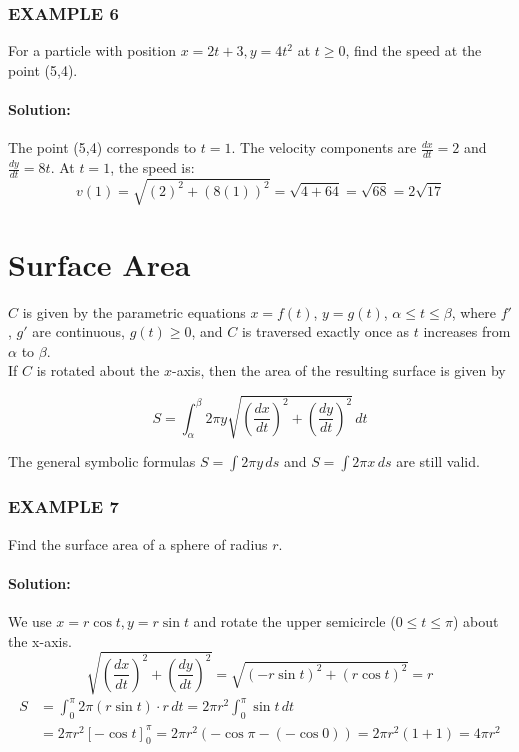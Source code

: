 \documentclass{article}
\begin{document}
\subsubsection*{EXAMPLE 6}
For a particle with position $x=2t+3, y=4t^2$ at $t \ge 0$, find the speed at the point (5,4).

\paragraph{Solution:}
The point (5,4) corresponds to $t=1$. The velocity components are $\frac{dx}{dt}=2$ and $\frac{dy}{dt}=8t$. At $t=1$, the speed is:
\[
v(1) = \sqrt{(2)^2 + (8(1))^2} = \sqrt{4+64} = \sqrt{68} = 2\sqrt{17}
\]

\section*{Surface Area}

 $C$ is given by the parametric equations $x = f(t)$, $y = g(t)$, $\alpha \le t \le \beta$, where $f'$, $g'$ are continuous, $g(t) \ge 0$, and $C$ is traversed exactly once as $t$ increases from $\alpha$ to $\beta$. 
\\If $C$ is rotated about the $x$-axis, then the area of the resulting surface is given by

\[
S = \int_{\alpha}^{\beta} 2\pi y \sqrt{\left(\frac{dx}{dt}\right)^2 + \left(\frac{dy}{dt}\right)^2} \, dt
\]

The general symbolic formulas $S = \int 2\pi y \, ds$ and $S = \int 2\pi x \, ds$  are still valid.

\subsubsection*{EXAMPLE 7}
Find the surface area of a sphere of radius $r$.

\paragraph{Solution:}
We use $x = r\cos t, y = r\sin t$ and rotate the upper semicircle ($0 \le t \le \pi$) about the x-axis.
\[
\sqrt{\left(\frac{dx}{dt}\right)^2 + \left(\frac{dy}{dt}\right)^2} = \sqrt{(-r\sin t)^2 + (r\cos t)^2} = r
\]
\begin{align*}
    S &= \int_{0}^{\pi} 2\pi (r\sin t) \cdot r \, dt = 2\pi r^2 \int_{0}^{\pi} \sin t \, dt \\
    &= 2\pi r^2 [-\cos t]_{0}^{\pi} = 2\pi r^2 (-\cos\pi - (-\cos 0)) = 2\pi r^2(1+1) = 4\pi r^2
\end{align*}
\end{document}
